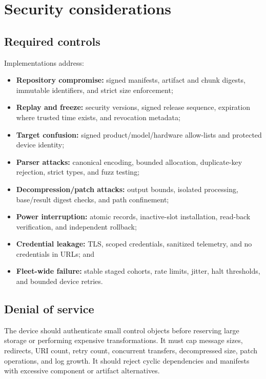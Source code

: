 \section{Security considerations}

\subsection{Required controls}

Implementations \must address:

\begin{itemize}
  \item \textbf{Repository compromise:} signed manifests, artifact and chunk digests,
        immutable identifiers, and strict size enforcement;
  \item \textbf{Replay and freeze:} security versions, signed release sequence,
        expiration where trusted time exists, and revocation metadata;
  \item \textbf{Target confusion:} signed product/model/hardware allow-lists and
        protected device identity;
  \item \textbf{Parser attacks:} canonical encoding, bounded allocation, duplicate-key
        rejection, strict types, and fuzz testing;
  \item \textbf{Decompression/patch attacks:} output bounds, isolated processing,
        base/result digest checks, and path confinement;
  \item \textbf{Power interruption:} atomic records, inactive-slot installation,
        read-back verification, and independent rollback;
  \item \textbf{Credential leakage:} TLS, scoped credentials, sanitized telemetry,
        and no credentials in URLs; and
  \item \textbf{Fleet-wide failure:} stable staged cohorts, rate limits, jitter,
        halt thresholds, and bounded device retries.
\end{itemize}

\subsection{Denial of service}

The device should authenticate small control objects before reserving large
storage or performing expensive transformations. It must cap message sizes,
redirects, URI count, retry count, concurrent transfers, decompressed size, patch
operations, and log growth. It should reject cyclic dependencies and manifests
with excessive component or artifact alternatives.

